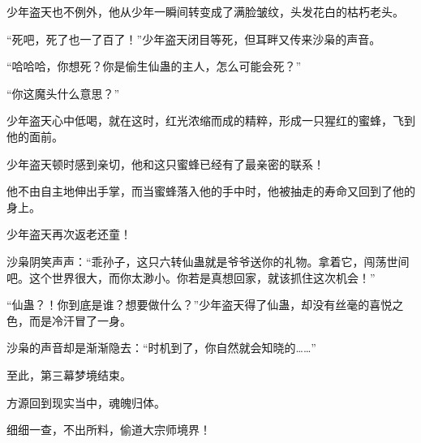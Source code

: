 \begin{this_body}
少年盗天也不例外，他从少年一瞬间转变成了满脸皱纹，头发花白的枯朽老头。

“死吧，死了也一了百了！”少年盗天闭目等死，但耳畔又传来沙枭的声音。

“哈哈哈，你想死？你是偷生仙蛊的主人，怎么可能会死？”

“你这魔头什么意思？”

少年盗天心中低喝，就在这时，红光浓缩而成的精粹，形成一只猩红的蜜蜂，飞到他的面前。

少年盗天顿时感到亲切，他和这只蜜蜂已经有了最亲密的联系！

他不由自主地伸出手掌，而当蜜蜂落入他的手中时，他被抽走的寿命又回到了他的身上。

少年盗天再次返老还童！

沙枭阴笑声声：“乖孙子，这只六转仙蛊就是爷爷送你的礼物。拿着它，闯荡世间吧。这个世界很大，而你太渺小。你若是真想回家，就该抓住这次机会！”

“仙蛊？！你到底是谁？想要做什么？”少年盗天得了仙蛊，却没有丝毫的喜悦之色，而是冷汗冒了一身。

沙枭的声音却是渐渐隐去：“时机到了，你自然就会知晓的……”

至此，第三幕梦境结束。

方源回到现实当中，魂魄归体。

细细一查，不出所料，偷道大宗师境界！

\end{this_body}

